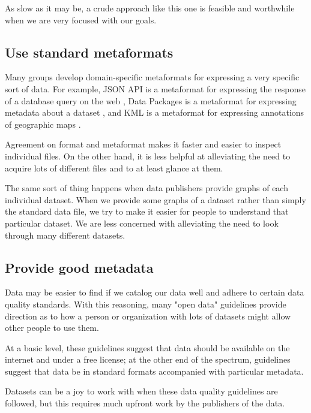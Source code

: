 \documentclass{acm_proc_article-sp}
\begin{document}
As slow as it may be, a crude approach like this one is feasible and
worthwhile when we are very focused with our goals.

\subsection{Use standard metaformats}
Many groups develop domain-specific metaformats for expressing a very specific
sort of data. For example, JSON API is a metaformat for expressing the
response of a database query on the web \cite{jsonapi}, Data Packages is a
metaformat for expressing metadata about a dataset \cite{datapackages},
and KML is a metaformat for expressing annotations of geographic maps \citep{kml}.

Agreement on format and metaformat makes it faster and easier to inspect
individual files. On the other hand, it is less helpful at alleviating the
need to acquire lots of different files and to at least glance at them.

The same sort of thing happens when data publishers provide graphs of
each individual dataset. When we provide some graphs of a dataset
rather than simply the standard data file, we try to make it easier for
people to understand that particular dataset. We are less concerned with
alleviating the need to look through many different datasets.

\subsection{Provide good metadata}
Data may be easier to find if we catalog our data well and adhere to
certain data quality standards. With this reasoning,
many "open data" guidelines provide direction as to how a person
or organization with lots of datasets might allow other people
to use them.
\cite{open-data-census,fivestars,sunlight,sebastopol,odi}

At a basic level, these guidelines suggest that data should
be available on the internet and under a free license; at the other
end of the spectrum, guidelines suggest that data be in standard
formats accompanied with particular metadata.

Datasets can be a joy to work with when these data quality guidelines
are followed, but this requires much upfront work by the publishers
of the data.
\end{document}
